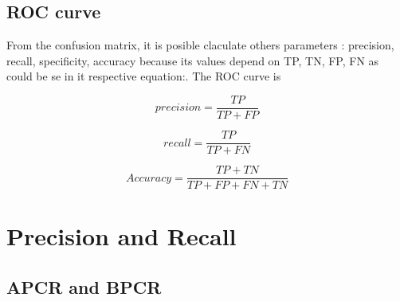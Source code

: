 \subsection{ROC curve}
From the confusion matrix, it is posible claculate others parameters \cite{Sokolova}: precision, recall, specificity, accuracy because its values depend on TP, TN, FP, FN as could be se in it respective equation:.
The ROC curve is

\begin{equation}
  precision = \frac{TP}{TP + FP}
\end{equation}

\begin{equation}
  recall = \frac{TP}{TP + FN}
\end{equation}

\begin{equation}
  Accuracy = \frac{TP + TN}{TP + FP + FN + TN}
\end{equation}

\section{Precision and Recall}

\subsection{APCR and BPCR}

